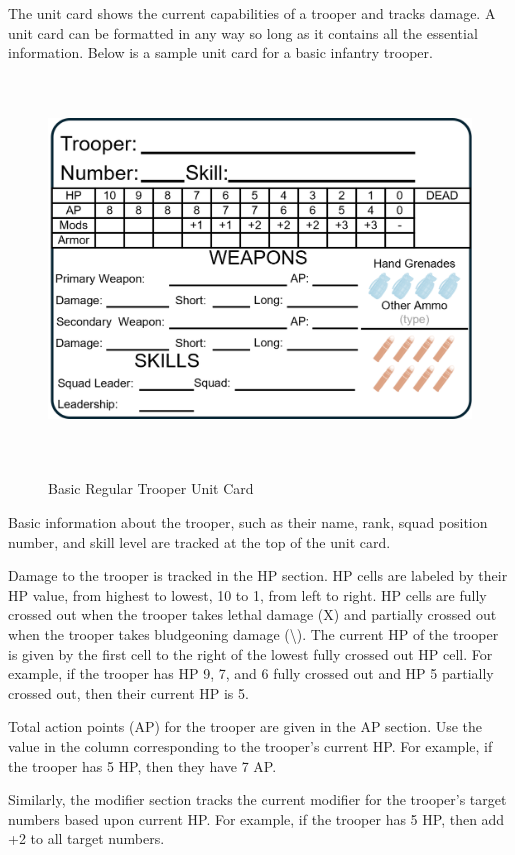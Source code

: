 The unit card shows the current capabilities of a trooper and tracks damage.
A unit card can be formatted in any way so long as it contains all the essential information.
Below is a sample unit card for a basic infantry trooper.

\begin{figure}[H]
  \centering
  \includegraphics[alt='Sample Regular Trooper', width=5.63in, height=4in]{img/RegularTrooper.png}
  \caption*{Basic Regular Trooper Unit Card}
\end{figure}

Basic information about the trooper, such as their name, rank, squad position number, and skill level are tracked at the top of the unit card.

Damage to the trooper is tracked in the HP section.
HP cells are labeled by their HP value, from highest to lowest, 10 to 1, from left to right.
HP cells are fully crossed out when the trooper takes lethal damage (X) and partially crossed out when the trooper takes bludgeoning damage (\textbackslash).
The current HP of the trooper is given by the first cell to the right of the lowest fully crossed out HP cell.
For example, if the trooper has HP 9, 7, and 6 fully crossed out and HP 5 partially crossed out, then their current HP is 5.

Total action points (AP) for the trooper are given in the AP section.
Use the value in the column corresponding to the trooper's current HP.
For example, if the trooper has 5 HP, then they have 7 AP.

Similarly, the modifier section tracks the current modifier for the trooper's target numbers based upon current HP.
For example, if the trooper has 5 HP, then add +2 to all target numbers.


